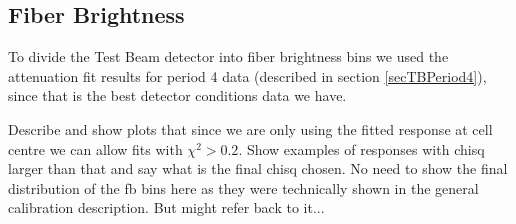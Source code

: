 \documentclass[12pt,a4paper]{article}
\begin{document}
\subsection{Fiber Brightness}

To divide the Test Beam detector into fiber brightness bins we used the attenuation fit results for period 4 data (described in section \ref{secTBPeriod4}), since that is the best detector conditions data we have.

Describe and show plots that since we are only using the fitted response at cell centre we can allow fits with $\chi^2>0.2$. Show examples of responses with chisq larger than that and say what is the final chisq chosen. No need to show the final distribution of the fb bins here as they were technically shown in the general calibration description. But might refer back to it...
\end{document}
